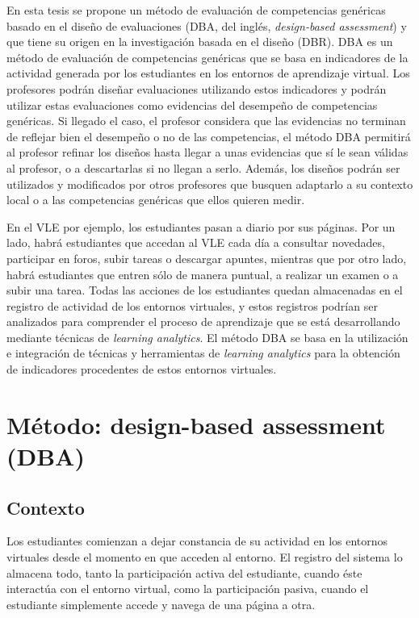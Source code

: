 En esta tesis se propone un método de evaluación de competencias genéricas basado en el diseño de evaluaciones (DBA, del inglés, \emph{design-based assessment}) y que tiene su origen en la investigación basada en el diseño (DBR). DBA es un método de evaluación de competencias genéricas que se basa en indicadores de la actividad generada por los estudiantes en los entornos de aprendizaje virtual. Los profesores podrán diseñar evaluaciones utilizando estos indicadores y podrán utilizar estas evaluaciones como evidencias del desempeño de competencias genéricas. Si llegado el caso, el profesor considera que las evidencias no terminan de reflejar bien el desempeño o no de las competencias, el método DBA permitirá al profesor refinar los diseños hasta llegar a unas evidencias que sí le sean válidas al profesor, o a descartarlas si no llegan a serlo. Además, los diseños podrán ser utilizados y modificados por otros profesores que busquen adaptarlo a su contexto local o a las competencias genéricas que ellos quieren medir. 

En el VLE por ejemplo, los estudiantes pasan a diario por sus páginas. Por un lado, habrá estudiantes que accedan al VLE cada día a consultar novedades, participar en foros, subir tareas o descargar apuntes, mientras que por otro lado, habrá estudiantes que entren sólo de manera puntual, a realizar un examen o a subir una tarea. Todas las acciones de los estudiantes quedan almacenadas en el registro de actividad de los entornos virtuales, y estos registros podrían ser analizados para comprender el proceso de aprendizaje que se está desarrollando mediante técnicas de \emph{learning analytics}. El método DBA se basa en la utilización e integración de técnicas y herramientas de \emph{learning analytics} para la obtención de indicadores procedentes de estos entornos virtuales.


\section{Método: design-based assessment (DBA)} \label{cha:met-sec:dba}

\subsection{Contexto}

Los estudiantes comienzan a dejar constancia de su actividad en los entornos virtuales desde el momento en que acceden al entorno. El registro del sistema lo almacena todo, tanto la participación activa del estudiante, cuando éste interactúa con el entorno virtual, como la participación pasiva, cuando el estudiante simplemente accede y navega de una página a otra. 

